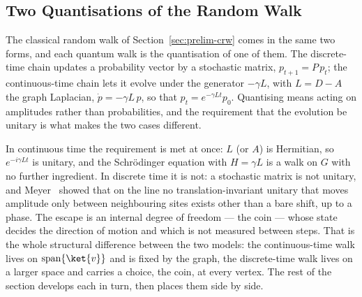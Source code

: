 \subsection{Two Quantisations of the Random Walk}
\label{sec:two-quantisations}
The classical random walk of Section~\ref{sec:prelim-crw} comes in the same
two forms, and each quantum walk is the quantisation of one of them. The
discrete-time chain updates a probability vector by a stochastic matrix,
$p_{t+1} = P\,p_t$; the continuous-time chain lets it evolve under the
generator $-\gamma L$, with $L = D - A$ the graph Laplacian, $\dot{p} =
-\gamma L\,p$, so that $p_t = e^{-\gamma L t} p_0$. Quantising means acting on
amplitudes rather than probabilities, and the requirement that the evolution
be unitary is what makes the two cases different.

In continuous time the requirement is met at once: $L$ (or $A$) is Hermitian,
so $e^{-i\gamma L t}$ is unitary, and the Schr\"odinger equation with $H =
\gamma L$ is a walk on $G$ with no further ingredient. In discrete time it is
not: a stochastic matrix is not unitary, and Meyer~\cite{Meyer_1996} showed
that on the line no translation-invariant unitary that moves amplitude only
between neighbouring sites exists other than a bare shift, up to a phase.
The escape is an internal degree of freedom --- the coin --- whose state
decides the direction of motion and which is not measured between steps.
That is the whole structural difference between the two models: the
continuous-time walk lives on $\operatorname{span}\{\ket{v}\}$ and is fixed by
the graph, the discrete-time walk lives on a larger space and carries a
choice, the coin, at every vertex. The rest of the section develops each in
turn, then places them side by side.

